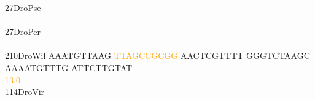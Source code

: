 \documentclass[11pt,twoside,reqno,a4paper]{article}
\begin{document}
{27\hspace*{3\charwidth}DroPse	----------	----------	----------	----------	----------	----------	\\
\hspace*{5\charwidth}\hspace*{7\charwidth}\hspace*{1\charwidth}\hspace*{1\charwidth}\hspace*{1\charwidth}\hspace*{1\charwidth}\hspace*{1\charwidth}\hspace*{1\charwidth}\\
27\hspace*{3\charwidth}DroPer	----------	----------	----------	----------	----------	----------	\\
\hspace*{5\charwidth}\hspace*{7\charwidth}\hspace*{1\charwidth}\hspace*{1\charwidth}\hspace*{1\charwidth}\hspace*{1\charwidth}\hspace*{1\charwidth}\hspace*{1\charwidth}\\
210\hspace*{2\charwidth}DroWil	AAATGTTAAG	\textcolor{orange}{T}\textcolor{orange}{T}\textcolor{orange}{A}\textcolor{orange}{G}\textcolor{orange}{C}\textcolor{orange}{C}\textcolor{orange}{G}\textcolor{orange}{C}\textcolor{orange}{G}\textcolor{orange}{G}	AACTCGTTTT	GGGTCTAAGC	AAAATGTTTG	ATTCTTGTAT	\\
\hspace*{5\charwidth}\hspace*{7\charwidth}\hspace*{1\charwidth}\hspace*{10\charwidth}\textcolor{orange}{13.0}\hspace*{1\charwidth}\hspace*{1\charwidth}\hspace*{1\charwidth}\hspace*{1\charwidth}\hspace*{1\charwidth}\\
114\hspace*{2\charwidth}DroVir	----------	----------	----------	----------	----------	----------	\\
\hspace*{5\charwidth}\hspace*{7\charwidth}\hspace*{1\charwidth}\hspace*{1\charwidth}\hspace*{1\charwidth}\hspace*{1\charwidth}\hspace*{1\charwidth}\hspace*{1\charwidth}\\
}
\end{document}
